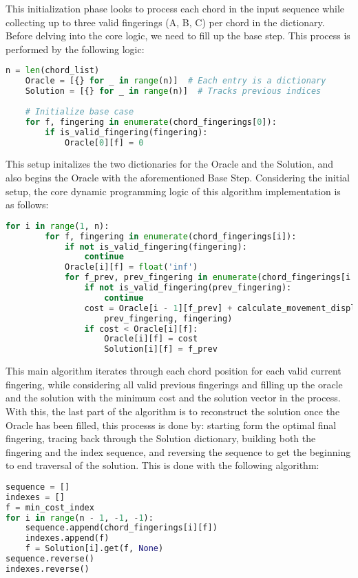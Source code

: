 \documentclass[conference]{IEEEtran}
\begin{document}
This initialization phase looks to process each chord in the input sequence while collecting up to three valid fingerings (A, B, C) per chord in the dictionary.
Before delving into the core logic, we need to fill up the base step. This process is performed by the following logic:
\begin{lstlisting}[language=Python]
    n = len(chord_list)
    Oracle = [{} for _ in range(n)]  # Each entry is a dictionary
    Solution = [{} for _ in range(n)]  # Tracks previous indices
    
    # Initialize base case
    for f, fingering in enumerate(chord_fingerings[0]):
        if is_valid_fingering(fingering):
            Oracle[0][f] = 0
\end{lstlisting}
This setup initalizes the two dictionaries for the Oracle and the Solution, and also begins the Oracle with the aforementioned Base Step. Considering the initial setup, the core dynamic programming logic of this algorithm implementation is as follows:
\begin{lstlisting}[language=Python]
    for i in range(1, n):
        for f, fingering in enumerate(chord_fingerings[i]):
            if not is_valid_fingering(fingering):
                continue
            Oracle[i][f] = float('inf')
            for f_prev, prev_fingering in enumerate(chord_fingerings[i - 1]):
                if not is_valid_fingering(prev_fingering):
                    continue
                cost = Oracle[i - 1][f_prev] + calculate_movement_displacement(
                    prev_fingering, fingering)
                if cost < Oracle[i][f]:
                    Oracle[i][f] = cost
                    Solution[i][f] = f_prev
\end{lstlisting}
This main algorithm iterates through each chord position for each valid current fingering, while considering all valid previous fingerings and filling up the oracle and the solution with the minimum cost and the solution vector in the process. With this, the last part of the algorithm is to reconstruct the solution once the Oracle has been filled, this processs is done by: starting form the optimal final fingering, tracing back through the Solution dictionary, building both the fingering and the index sequence, and reversing the sequence to get the beginning to end traversal of the solution. This is done with the following algorithm:
\newpage
\begin{lstlisting}[language=Python]
sequence = []
indexes = []
f = min_cost_index
for i in range(n - 1, -1, -1):
    sequence.append(chord_fingerings[i][f])
    indexes.append(f)
    f = Solution[i].get(f, None)
sequence.reverse()
indexes.reverse()
\end{lstlisting}
\end{document}
